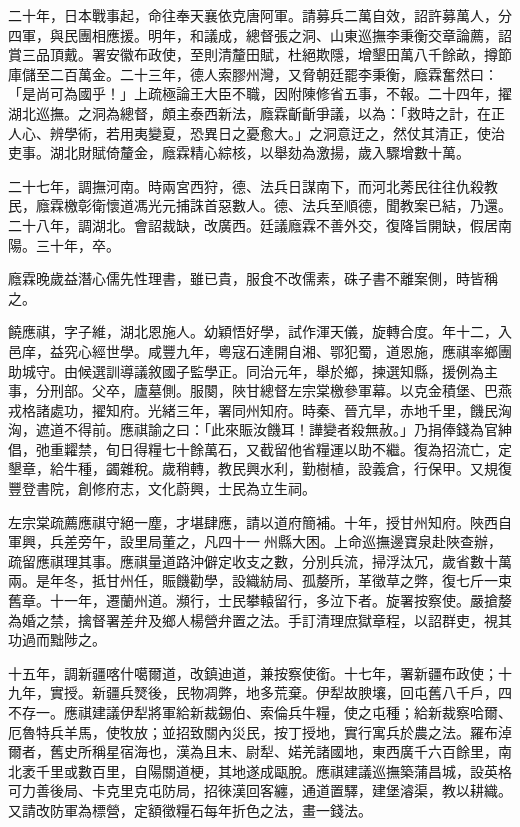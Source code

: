 \begin{pinyinscope}
二十年，日本戰事起，命往奉天襄依克唐阿軍。請募兵二萬自效，詔許募萬人，分四軍，與民團相應援。明年，和議成，總督張之洞、山東巡撫李秉衡交章論薦，詔賞三品頂戴。署安徽布政使，至則清釐田賦，杜絕欺隱，增墾田萬八千餘畝，撙節庫儲至二百萬金。二十三年，德人索膠州灣，又脅朝廷罷李秉衡，廕霖奮然曰：「是尚可為國乎！」上疏極論王大臣不職，因附陳修省五事，不報。二十四年，擢湖北巡撫。之洞為總督，頗主泰西新法，廕霖齗齗爭議，以為：「救時之計，在正人心、辨學術，若用夷變夏，恐異日之憂愈大。」之洞意迂之，然仗其清正，使治吏事。湖北財賦倚釐金，廕霖精心綜核，以舉劾為激揚，歲入驟增數十萬。

二十七年，調撫河南。時兩宮西狩，德、法兵日謀南下，而河北莠民往往仇殺教民，廕霖檄彰衛懷道馮光元捕誅首惡數人。德、法兵至順德，聞教案已結，乃還。二十八年，調湖北。會詔裁缺，改廣西。廷議廕霖不善外交，復降旨開缺，假居南陽。三十年，卒。

廕霖晚歲益潛心儒先性理書，雖已貴，服食不改儒素，硃子書不離案側，時皆稱之。

饒應祺，字子維，湖北恩施人。幼穎悟好學，試作渾天儀，旋轉合度。年十二，入邑庠，益究心經世學。咸豐九年，粵寇石達開自湘、鄂犯蜀，道恩施，應祺率鄉團助城守。由候選訓導議敘國子監學正。同治元年，舉於鄉，揀選知縣，援例為主事，分刑部。父卒，廬墓側。服闋，陜甘總督左宗棠檄參軍幕。以克金積堡、巴燕戎格諸處功，擢知府。光緒三年，署同州知府。時秦、晉亢旱，赤地千里，饑民洶洶，遮道不得前。應祺諭之曰：「此來賑汝饑耳！譁變者殺無赦。」乃捐俸錢為官紳倡，弛重糶禁，旬日得糧七十餘萬石，又截留他省糧運以助不繼。復為招流亡，定墾章，給牛種，蠲雜稅。歲稍轉，教民興水利，勤樹植，設義倉，行保甲。又規復豐登書院，創修府志，文化蔚興，士民為立生祠。

左宗棠疏薦應祺守絕一塵，才堪肆應，請以道府簡補。十年，授甘州知府。陜西自軍興，兵差旁午，設里局董之，凡四十一州縣大困。上命巡撫邊寶泉赴陜查辦，疏留應祺理其事。應祺量道路沖僻定收支之數，分別兵流，掃浮汰冗，歲省數十萬兩。是年冬，抵甘州任，賑饑勸學，設織紡局、孤嫠所，革徵草之弊，復七斤一束舊章。十一年，遷蘭州道。瀕行，士民攀轅留行，多泣下者。旋署按察使。嚴搶嫠為婚之禁，擒督署差弁及鄉人楊營弁置之法。手訂清理庶獄章程，以詔群吏，視其功過而黜陟之。

十五年，調新疆喀什噶爾道，改鎮迪道，兼按察使銜。十七年，署新疆布政使；十九年，實授。新疆兵燹後，民物凋弊，地多荒棄。伊犁故腴壤，回屯舊八千戶，四不存一。應祺建議伊犁將軍給新裁錫伯、索倫兵牛糧，使之屯種；給新裁察哈爾、厄魯特兵羊馬，使牧放；並招致關內災民，按丁授地，實行寓兵於農之法。羅布淖爾者，舊史所稱星宿海也，漢為且末、尉犁、婼羌諸國地，東西廣千六百餘里，南北袤千里或數百里，自陽關道梗，其地遂成甌脫。應祺建議巡撫築蒲昌城，設英格可力善後局、卡克里克屯防局，招徠漢回客纏，通道置驛，建堡濬渠，教以耕織。又請改防軍為標營，定額徵糧石每年折色之法，畫一錢法。


\end{pinyinscope}
